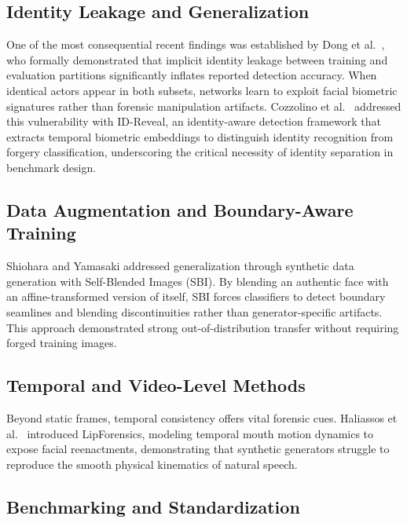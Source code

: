 \documentclass[conference]{IEEEtran}
\begin{document}
\subsection{Identity Leakage and Generalization}

One of the most consequential recent findings was established by Dong et al.\ \cite{dong2023implicit}, who formally demonstrated that implicit identity leakage between training and evaluation partitions significantly inflates reported detection accuracy. When identical actors appear in both subsets, networks learn to exploit facial biometric signatures rather than forensic manipulation artifacts. Cozzolino et al.\ \cite{cozzolino2021idreveal} addressed this vulnerability with ID-Reveal, an identity-aware detection framework that extracts temporal biometric embeddings to distinguish identity recognition from forgery classification, underscoring the critical necessity of identity separation in benchmark design.

\subsection{Data Augmentation and Boundary-Aware Training}

Shiohara and Yamasaki \cite{shiohara2022sbi} addressed generalization through synthetic data generation with Self-Blended Images (SBI). By blending an authentic face with an affine-transformed version of itself, SBI forces classifiers to detect boundary seamlines and blending discontinuities rather than generator-specific artifacts. This approach demonstrated strong out-of-distribution transfer without requiring forged training images.

\subsection{Temporal and Video-Level Methods}

Beyond static frames, temporal consistency offers vital forensic cues. Haliassos et al.\ \cite{haliassos2021lips} introduced LipForensics, modeling temporal mouth motion dynamics to expose facial reenactments, demonstrating that synthetic generators struggle to reproduce the smooth physical kinematics of natural speech.

\subsection{Benchmarking and Standardization}
\end{document}
